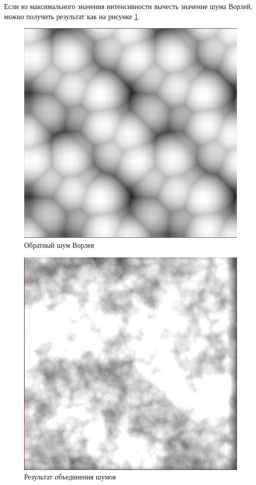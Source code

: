 Если из максимального значения интенсивности вычесть значение шума Ворлей, можно получить результат как на рисунке \ref{img:worley2}

\begin{figure}[H]
    \centering
    \includegraphics[scale=0.4]{img/worley2.png}
    \caption{Обратный шум Ворлея}
    \label{img:worley2}
\end{figure}

\begin{figure}[H]
    \centering
    \includegraphics[scale=0.4]{img/result_noise.png}
    \caption{Результат объединения шумов}
    \label{img:result_noise}
\end{figure}

